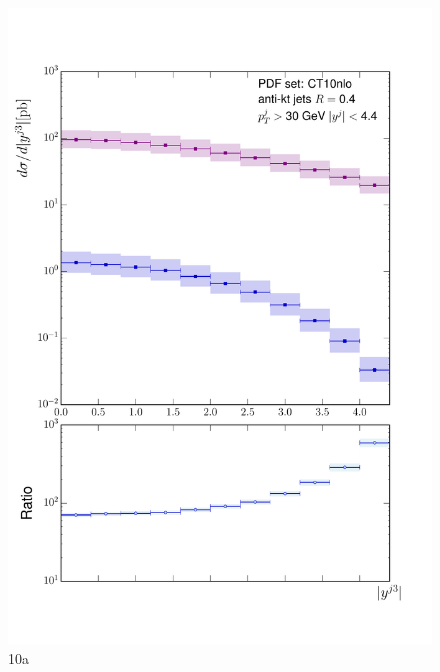 	\begin{figure}[h]
		\centering
		\includegraphics[width=0.8\linewidth]{Figures/ATLAS_Z_100TeV_10a.pdf}
		\caption{10a}
		\label{fig:emissionsites}
	\end{figure}

